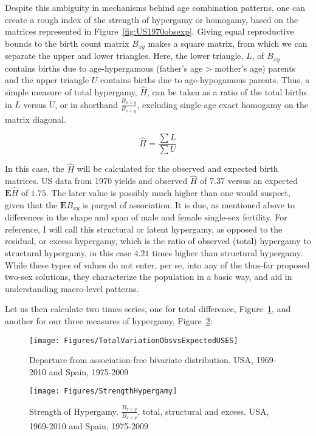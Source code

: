 Despite this ambiguity in mechanisms behind age combination patterns, one can
create a rough index of the strength of hypergamy or homogamy, based on the
matrices represented in Figure~\ref{fig:US1970obsexp}. Giving equal reproductive
bounds to the birth count matrix $B_{xy}$ makes a square matrix, from which we
can separate the upper and lower triangles. Here, the lower triangle, $L$,
of $B_{xy}$ contains births due to age-hypergamous (father's age > mother's age)
parents and the upper triangle $U$ contains births due to age-hypogamous parents. Thus, a simple
measure of total hypergamy, $\widehat{H}$, can be taken as a ratio of the total
births in $L$ versus $U$, or in shorthand $\frac{B_{x>y}}{B_{x<y}}$, excluding
single-age exact homogamy on the matrix diagonal.

\begin{equation}
\widehat{H} = \frac{\sum L}{\sum U} 
\end{equation}

In this case, the $\widehat{H}$ will be calculated for the observed and expected
birth matrices. US data from 1970 yields and observed $\widehat{H}$ of $7.37$
versus an expected $\textbf{E}\widehat{H}$ of $1.75$. The later value is
possibly much higher than one would suspect, given that the $\textbf{E}B_{xy}$
is purged of association. It is due, as mentioned above to differences in the
shape and span of male and female single-sex fertility. For reference, I
will call this structural or latent hypergamy, as opposed to the residual, or
excess hypergamy, which is the ratio of observed (total) hypergamy to
structural hypergamy, in this case $4.21$ times higher
than structural hypergamy. While these types of values do not enter, per se, 
into any of the thus-far proposed two-sex solutions, they characterize the 
population in a basic way, and aid in understanding macro-level patterns. 

Let us then calculate two times series, one for total difference,
Figure~\ref{fig:Theta}, and another for our three measures of hypergamy,
Figure~\ref{fig:HypergamyStrength}:

\begin{figure}[!ht]
  \centering
    \caption{Departure from association-free bivariate distribution. USA,
    1969-2010 and Spain, 1975-2009}
     \texttt{[image: Figures/TotalVariationObsvsExpectedUSES]}
     \label{fig:Theta}
\end{figure}

\begin{figure}[!ht]
  \centering
    \caption{Strength of Hypergamy, $\frac{B_{x>y}}{B_{x<y}}$, total, structural
    and excess. USA, 1969-2010 and Spain, 1975-2009}
    \texttt{[image: Figures/StrengthHypergamy]}      
    \label{fig:HypergamyStrength}
\end{figure}










